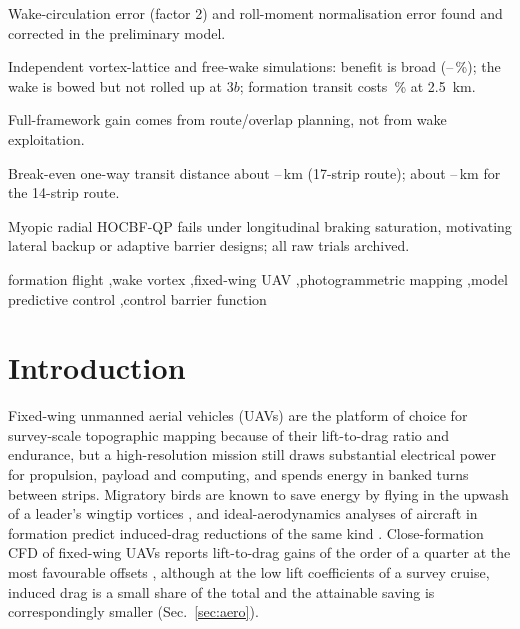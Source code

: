 \documentclass[preprint,12pt]{elsarticle}
\begin{document}
\begin{frontmatter}
\begin{highlights}
\item Wake-circulation error (factor 2) and roll-moment normalisation error found and corrected in the preliminary model.
\item Independent vortex-lattice and free-wake simulations: benefit is broad (\npeakFree--\npeakSheet\,\%); the wake is bowed but not rolled up at $3b$; formation transit costs \nrelBSheet\,\% at \SI{2.5}{km}.
\item Full-framework gain comes from route/overlap planning, not from wake exploitation.
\item Break-even one-way transit distance about \nbeSevSheet--\nbeSevFree\,km (17-strip route); about \nbeFourteenSheet--\nbeFourteenFree\,km for the 14-strip route.
\item Myopic radial HOCBF-QP fails under longitudinal braking saturation, motivating lateral backup or adaptive barrier designs; all raw trials archived.
\end{highlights}

\begin{keyword}
formation flight \sep wake vortex \sep fixed-wing UAV \sep photogrammetric mapping \sep model predictive control \sep control barrier function
\end{keyword}
\end{frontmatter}

\linenumbers


\section{Introduction}
Fixed-wing unmanned aerial vehicles (UAVs) are the platform of choice for survey-scale topographic mapping because of their lift-to-drag ratio and endurance, but a high-resolution mission still draws substantial electrical power for propulsion, payload and computing, and spends energy in banked turns between strips. Migratory birds are known to save energy by flying in the upwash of a leader's wingtip vortices \cite{lissaman1970,hummel1983,weimerskirch2001}, and ideal-aerodynamics analyses of aircraft in formation predict induced-drag reductions of the same kind \cite{king2005,katz2001}. Close-formation CFD of fixed-wing UAVs reports lift-to-drag gains of the order of a quarter at the most favourable offsets \cite{oendo2025}, although at the low lift coefficients of a survey cruise, induced drag is a small share of the total and the attainable saving is correspondingly smaller (Sec.~\ref{sec:aero}).
\end{document}
